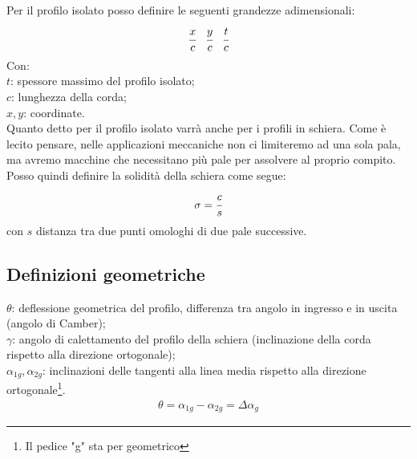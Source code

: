 Per il profilo isolato posso definire le seguenti grandezze adimensionali:
\begin{align*}
\cfrac{x}{c} \;\;\; \cfrac{y}{c} \;\;\; \cfrac{t}{c}
\end{align*}
Con:\\
$t$: spessore massimo del profilo isolato;\\
$c$: lunghezza della corda;\\
$x,y$: coordinate.\\[2mm]
Quanto detto per il profilo isolato varrà anche per i profili in schiera. Come è lecito pensare, nelle applicazioni meccaniche non ci limiteremo ad una sola pala, ma avremo macchine che necessitano più pale per assolvere al proprio compito. Posso quindi definire la solidità della schiera come segue:
\begin{equation}
\sigma = \cfrac{c}{s}
\end{equation}
con $s$ distanza tra due punti omologhi di due pale successive.

\subsection{Definizioni geometriche}
$\theta$: deflessione geometrica del profilo, differenza tra angolo in ingresso e in uscita (angolo di Camber);\\
$\gamma$: angolo di calettamento del profilo della schiera (inclinazione della corda rispetto alla direzione ortogonale);\\
$\alpha_{1g}, \alpha_{2g}$: inclinazioni delle tangenti alla linea media rispetto alla direzione ortogonale\footnote{Il pedice "g" sta per geometrico}.
\begin{align*}
\theta = \alpha_{1g} - \alpha_{2g} = \Delta \alpha_{g}
\end{align*}

